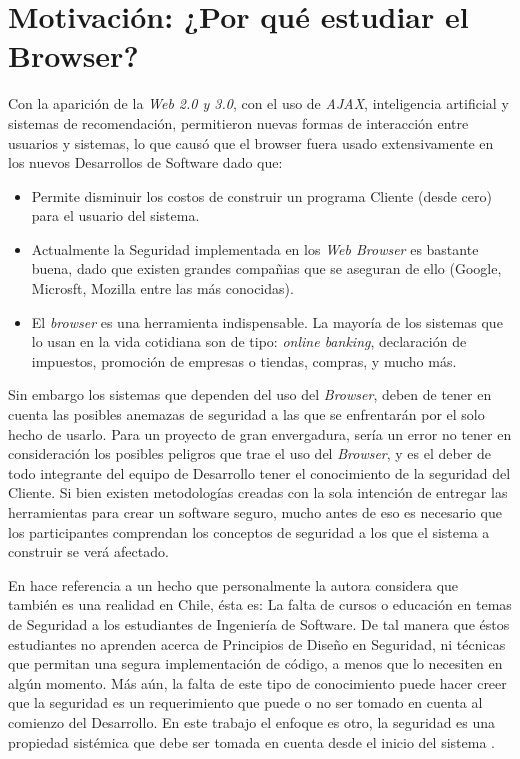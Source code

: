 \section{Motivación: ¿Por qué estudiar el Browser?}
\label{chap1:motiv}
Con la aparición de la \textit{Web 2.0 y 3.0}, con el uso de \textit{AJAX}, inteligencia artificial y sistemas de recomendación, permitieron nuevas formas de interacción entre usuarios y sistemas, lo que causó que el browser fuera usado extensivamente en los nuevos Desarrollos de Software dado que:
\begin{itemize}
	\item Permite disminuir los costos de construir un programa Cliente (desde cero) para el usuario del sistema.
	\item Actualmente la Seguridad implementada en los \textit{Web Browser} es bastante buena, dado que existen grandes compañias que se aseguran de ello (Google, Microsft, Mozilla entre las más conocidas). 
	\item El \textit{browser} es una herramienta indispensable. La mayoría de los sistemas que lo usan en la vida cotidiana son de tipo: \textit{online banking}, declaración de impuestos, promoción de empresas o tiendas, compras, y mucho más.
\end{itemize}


Sin embargo los sistemas que dependen del uso del \textit{Browser}, deben de tener en cuenta las posibles anemazas de seguridad a las que se enfrentarán por el solo hecho de usarlo. Para un proyecto de gran envergadura, sería un error no tener en consideración los posibles peligros que trae el uso del \textit{Browser}, y es el deber de todo integrante del equipo de Desarrollo tener el conocimiento de la seguridad del Cliente. Si bien existen metodologías creadas con la sola intención de entregar las herramientas para crear un software seguro, mucho antes de eso es necesario que los participantes comprendan los conceptos de seguridad a los que el sistema a construir se verá afectado. 

En \cite{goertzel2007software} hace referencia a un hecho que personalmente la autora considera que también es una realidad en Chile, ésta es: La falta de cursos o educación en temas de Seguridad a los estudiantes de Ingeniería de Software. De tal manera que éstos estudiantes no aprenden acerca de Principios de Diseño en Seguridad, ni técnicas que permitan una segura implementación de código, a menos que lo necesiten en algún momento. Más aún, la falta de este tipo de conocimiento puede hacer creer que la seguridad es un requerimiento que puede o no ser tomado en cuenta al comienzo del Desarrollo. En este trabajo el enfoque es otro, la seguridad es una propiedad sistémica que debe ser tomada en cuenta desde el inicio del sistema \cite{goertzel2007software, braz2008eliciting, fernandez2013security}.

